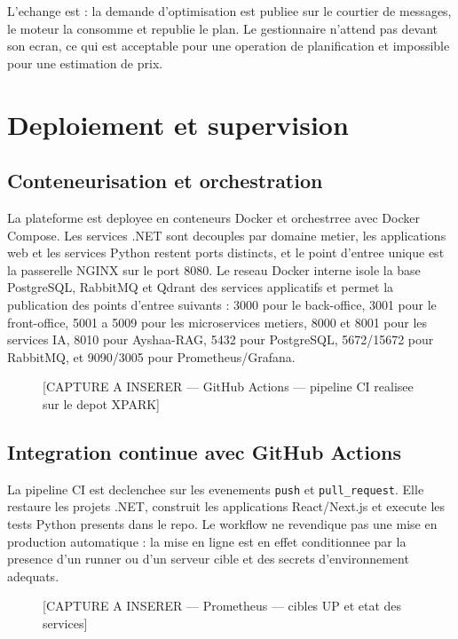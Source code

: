 L'echange est  : la demande d'optimisation est
publiee sur le courtier de messages, le moteur la consomme et republie le
plan. Le gestionnaire n'attend pas devant son ecran, ce qui est acceptable
pour une operation de planification et impossible pour une estimation de
prix.

\section{Deploiement et supervision}

\subsection{Conteneurisation et orchestration}

La plateforme est deployee en conteneurs Docker et orchestrree avec Docker
Compose. Les services .NET sont decouples par domaine metier, les
applications web et les services Python restent ports distincts, et le
point d'entree unique est la passerelle NGINX sur le port 8080. Le
reseau Docker interne isole la base PostgreSQL, RabbitMQ et Qdrant des
services applicatifs et permet la publication des points d'entree
suivants : 3000 pour le back-office, 3001 pour le front-office, 5001 a
5009 pour les microservices metiers, 8000 et 8001 pour les services IA,
8010 pour Ayshaa-RAG, 5432 pour PostgreSQL, 5672/15672 pour RabbitMQ,
et 9090/3005 pour Prometheus/Grafana.

\begin{figure}[H]
\centering
\caption{[CAPTURE A INSERER — GitHub Actions — pipeline CI realisee sur le depot XPARK]}
\label{fig:gha-ci}
\end{figure}

\subsection{Integration continue avec GitHub Actions}

La pipeline CI est declenchee sur les evenements \texttt{push} et
\texttt{pull\_request}. Elle restaure les projets .NET, construit les
applications React/Next.js et execute les tests Python presents dans le
repo. Le workflow ne revendique pas une mise en production automatique :
la mise en ligne est en effet conditionnee par la presence d'un runner ou
d'un serveur cible et des secrets d'environnement adequats.

\begin{figure}[H]
\centering
\caption{[CAPTURE A INSERER — Prometheus — cibles UP et etat des services]}
\label{fig:prometheus-up}
\end{figure}

